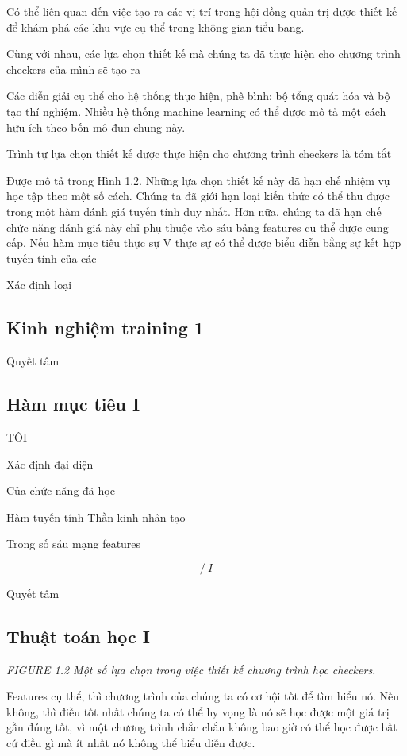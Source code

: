 Có thể liên quan đến việc tạo ra các vị trí trong hội đồng quản trị được thiết kế để khám phá các khu vực cụ thể trong không gian tiểu bang.

Cùng với nhau, các lựa chọn thiết kế mà chúng ta đã thực hiện cho chương trình checkers của mình sẽ tạo ra

Các diễn giải cụ thể cho hệ thống thực hiện, phê bình; bộ tổng quát hóa và bộ tạo thí nghiệm. Nhiều hệ thống machine learning có thể được mô tả một cách hữu ích theo bốn mô-đun chung này.

Trình tự lựa chọn thiết kế được thực hiện cho chương trình checkers là tóm tắt

Được mô tả trong Hình 1.2. Những lựa chọn thiết kế này đã hạn chế nhiệm vụ học tập theo một số cách. Chúng ta đã giới hạn loại kiến ​​thức có thể thu được trong một hàm đánh giá tuyến tính duy nhất. Hơn nữa, chúng ta đã hạn chế chức năng đánh giá này chỉ phụ thuộc vào sáu bảng features cụ thể được cung cấp. Nếu hàm mục tiêu thực sự V thực sự có thể được biểu diễn bằng sự kết hợp tuyến tính của các

Xác định loại

\subsection{Kinh nghiệm training 1}

Quyết tâm

\subsection{Hàm mục tiêu I}

TÔI

Xác định đại diện

Của chức năng đã học

Hàm tuyến tính Thần kinh nhân tạo

Trong số sáu mạng features

\[/ \ I\]

Quyết tâm

\subsection{Thuật toán học I}

\noindent\textit{FIGURE 1.2 Một số lựa chọn trong việc thiết kế chương trình học checkers.}

Features cụ thể, thì chương trình của chúng ta có cơ hội tốt để tìm hiểu nó. Nếu không, thì điều tốt nhất chúng ta có thể hy vọng là nó sẽ học được một giá trị gần đúng tốt, vì một chương trình chắc chắn không bao giờ có thể học được bất cứ điều gì mà ít nhất nó không thể biểu diễn được.

